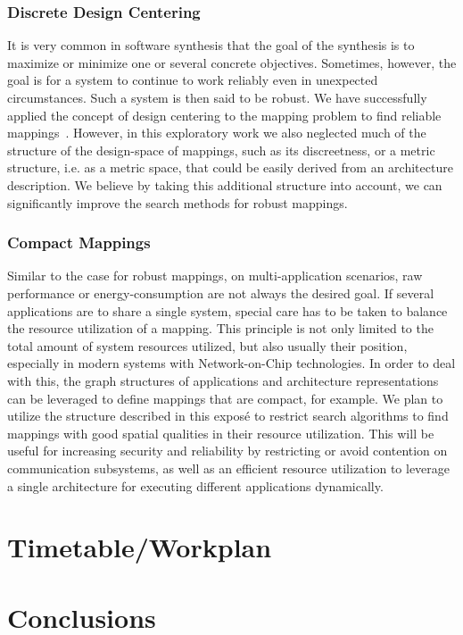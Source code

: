 \documentclass[sigplan,10pt]{acmart}
\begin{document}
\subsubsection{Discrete Design Centering} 
It is very common in software synthesis that the goal of the synthesis is to maximize or minimize one or several concrete objectives.
Sometimes, however, the goal is for a system to continue to work reliably even in unexpected circumstances. Such a system is then said to be robust. 
We have successfully applied the concept of design centering to the mapping problem to find reliable mappings~\cite{hempel2017robust}.
However, in this exploratory work we also neglected much of the structure of the design-space of mappings, such as its discreetness, or a metric structure, i.e. as a metric space, that could be easily derived from an architecture description.
We believe by taking this additional structure into account, we can significantly improve the search methods for robust mappings.

\subsubsection{Compact Mappings}
Similar to the case for robust mappings, on multi-application scenarios, raw performance or energy-consumption are not always the desired goal. If several applications are to share a single system, special care has to be taken to balance the resource utilization of a mapping.
This principle is not only limited to the total amount of system resources utilized, but also usually their position, especially in modern systems with Network-on-Chip technologies.
In order to deal with this, the graph structures of applications and architecture representations can be leveraged to define mappings that are compact, for example.
We plan to utilize the structure described in this exposé to restrict search algorithms to find mappings with good spatial qualities in their resource utilization. This will be useful for increasing security and reliability by restricting or avoid contention on communication subsystems,
as well as an efficient resource utilization to leverage a single architecture for executing different applications dynamically.

\section{Timetable/Workplan}




\section{Conclusions} 
%

 
\end{document}
